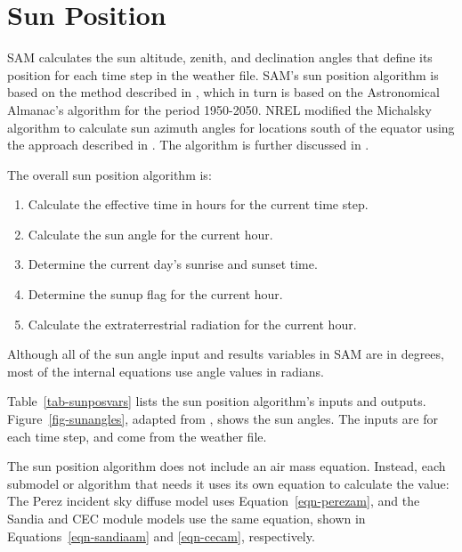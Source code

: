 \documentclass[12pt,letterpaper]{article}
\begin{document}
\chapter{Sun Position}\label{sec-sunposition}

SAM calculates the sun altitude, zenith, and declination angles that define its position for each time step in the weather file. SAM's sun position algorithm is based on the method described in \citet{michalsky1988}, which in turn is based on the Astronomical Almanac's algorithm for the period 1950-2050. NREL modified the Michalsky algorithm to calculate sun azimuth angles for locations south of the equator using the approach described in \citep{iqbal1983}. The algorithm is further discussed in \citet{stackoverflow2012}.

The overall sun position algorithm is:
\begin{enumerate}
\item Calculate the effective time in hours for the current time step.
\item Calculate the sun angle for the current hour.
\item Determine the current day's sunrise and sunset time.
\item Determine the sunup flag for the current hour.
\item Calculate the extraterrestrial radiation for the current hour.
\end{enumerate}

Although all of the sun angle input and results variables in SAM are in degrees, most of the internal equations use angle values in radians.

Table~\ref{tab-sunposvars} lists the sun position algorithm's inputs and outputs. Figure~\ref{fig-sunangles}, adapted from \citet{dunlap2007}, shows the sun angles. The inputs are for each time step, and come from the weather file. 

The sun position algorithm does not include an air mass equation. Instead, each submodel or algorithm that needs it uses its own equation to calculate the value: The Perez incident sky diffuse model uses Equation~\ref{eqn-perezam}, and the Sandia and CEC module models use the same equation, shown in Equations~\ref{eqn-sandiaam} and \ref{eqn-cecam}, respectively. 
\end{document}
